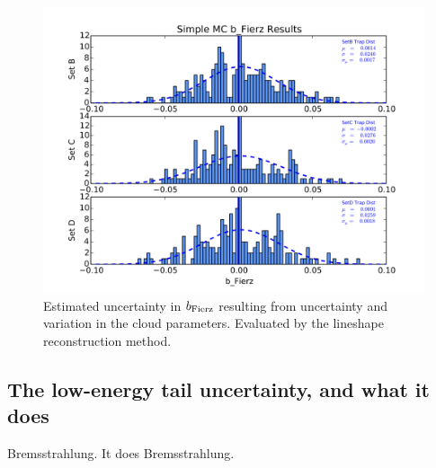 	    \begin{figure}[h!!]
    	\centering
    	\includegraphics[width=.999\linewidth]
    	{Figures/Position_Err_bFierz.png}
    	\caption[$\bFierz$ Position Error]{Estimated uncertainty in $\bFierz$ resulting from uncertainty and variation in the cloud parameters.  Evaluated by the lineshape reconstruction method.}		
    	\label{fig:bFierz_position_err}
		\end{figure}

	
	\subsection{The low-energy tail uncertainty, and what it does}
	Bremsstrahlung.  It does Bremsstrahlung.

